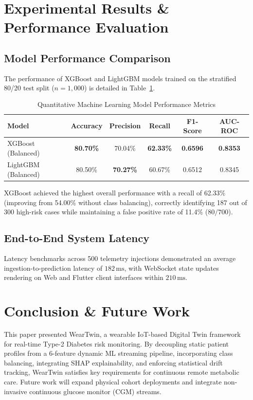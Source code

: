 \documentclass[conference]{IEEEtran}
\begin{document}
\section{Experimental Results \& Performance Evaluation}

\subsection{Model Performance Comparison}
The performance of XGBoost and LightGBM models trained on the stratified 80/20 test split ($n=1{,}000$) is detailed in Table~\ref{tab:ml_results}.

\begin{table}[htbp]
\caption{Quantitative Machine Learning Model Performance Metrics}
\label{tab:ml_results}
\begin{center}
\begin{tabular}{|l|c|c|c|c|c|}
\hline
\textbf{Model} & \textbf{Accuracy} & \textbf{Precision} & \textbf{Recall} & \textbf{F1-Score} & \textbf{AUC-ROC} \\
\hline
XGBoost (Balanced) & \textbf{80.70\%} & 70.04\% & \textbf{62.33\%} & \textbf{0.6596} & \textbf{0.8353} \\
LightGBM (Balanced) & 80.50\% & \textbf{70.27\%} & 60.67\% & 0.6512 & 0.8345 \\
\hline
\end{tabular}
\end{center}
\end{table}

XGBoost achieved the highest overall performance with a recall of 62.33\% (improving from 54.00\% without class balancing), correctly identifying 187 out of 300 high-risk cases while maintaining a false positive rate of 11.4\% ($80 / 700$).

\subsection{End-to-End System Latency}
Latency benchmarks across 500 telemetry injections demonstrated an average ingestion-to-prediction latency of $182\,\text{ms}$, with WebSocket state updates rendering on Web and Flutter client interfaces within $210\,\text{ms}$.

\section{Conclusion \& Future Work}
This paper presented WearTwin, a wearable IoT-based Digital Twin framework for real-time Type-2 Diabetes risk monitoring. By decoupling static patient profiles from a 6-feature dynamic ML streaming pipeline, incorporating class balancing, integrating SHAP explainability, and enforcing statistical drift tracking, WearTwin satisfies key requirements for continuous remote metabolic care. Future work will expand physical cohort deployments and integrate non-invasive continuous glucose monitor (CGM) streams.
\end{document}
